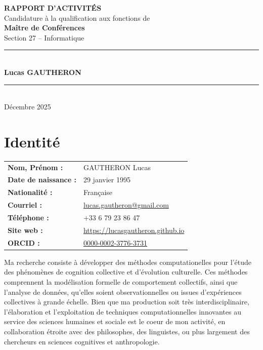 \documentclass[11pt,a4paper]{article}
\begin{document}

\begin{center}
{\LARGE\bfseries RAPPORT D'ACTIVITÉS}\\[0.5cm]
{\large Candidature à la qualification aux fonctions de}\\[0.2cm]
{\Large\bfseries Maître de Conférences}\\[0.3cm]
{\large Section 27 -- Informatique}\\[1cm]
\rule{\textwidth}{1pt}\\[0.5cm]
{\Huge\bfseries Lucas GAUTHERON}\\[0.5cm]
\rule{\textwidth}{1pt}\\[1cm]
{\large Décembre 2025}
\end{center}

\vspace{1cm}

\tableofcontents

\newpage


\section{Identité}

\begin{tabular}{@{}ll}
\textbf{Nom, Prénom :} & GAUTHERON Lucas \\
\textbf{Date de naissance :} & 29 janvier 1995 \\
\textbf{Nationalité :} & Française \\
\textbf{Courriel :} & \href{mailto:lucas.gautheron@gmail.com}{lucas.gautheron@gmail.com} \\
\textbf{Téléphone :} & +33 6 79 23 86 47 \\
\textbf{Site web :} & \url{https://lucasgautheron.github.io} \\
\textbf{ORCID :} & \href{https://orcid.org/0000-0002-3776-3731}{0000-0002-3776-3731} \\
\end{tabular}

\vspace{0.5cm}

Ma recherche consiste à développer des méthodes computationelles pour l'étude des phénomènes de cognition collective et d'évolution culturelle. 
Ces méthodes comprennent la modélisation formelle de comportement collectifs, ainsi que l'analyse de données, qu'elles soient observationnelles ou issues d'expériences collectives à grande échelle. Bien que ma production soit très interdisciplinaire, l'élaboration et l'exploitation de techniques computationnelles innovantes au service des sciences humaines et sociale est le coeur de mon activité, en collaboration étroite avec des philosophes, des linguistes, ou plus largement des chercheurs en sciences cognitives et anthropologie.
\end{document}
